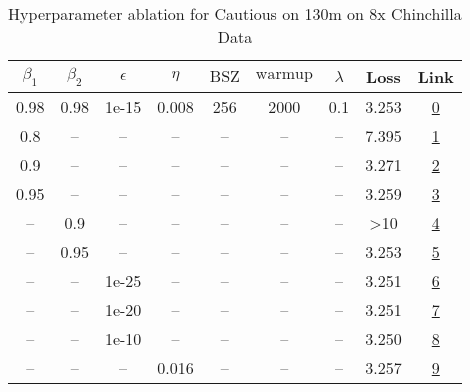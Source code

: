 \begin{table}[H]
\centering
\caption{Hyperparameter ablation for Cautious on 130m on 8x Chinchilla Data}
\label{tab:ablation_cautious_130m_8}
\begin{tabular}{ccccccccc}
\toprule
$\beta_1$ & $\beta_2$ & $\epsilon$ & $\eta$ & $\mathrm{BSZ}$ & $\mathrm{warmup}$ & $\lambda$ & Loss & Link \\
\midrule
0.98 & 0.98 & 1e-15 & 0.008 & 256 & 2000 & 0.1 & 3.253 & \href{https://wandb.ai/stanford-mercury/optimizer-scaling/runs/sweep-130m-21B-cautious3e1de9lr0.008-wd0.1-minlr0-warmup2000-b10-8f1bb6}{0} \\
\midrule
0.8 & -- & -- & -- & -- & -- & -- & 7.395 & \href{https://wandb.ai/stanford-mercury/optimizer-scaling/runs/sweep-130m-21B-cautious903025lr0.008-wd0.1-minlr0-warmup2000-b10-c9b0ed}{1} \\
0.9 & -- & -- & -- & -- & -- & -- & 3.271 & \href{https://wandb.ai/stanford-mercury/optimizer-scaling/runs/sweep-130m-21B-cautiousdb200alr0.008-wd0.1-minlr0-warmup2000-b10-d34aeb}{2} \\
0.95 & -- & -- & -- & -- & -- & -- & 3.259 & \href{https://wandb.ai/stanford-mercury/optimizer-scaling/runs/sweep-130m-21B-cautious1b41e3lr0.008-wd0.1-minlr0-warmup2000-b10-e60376}{3} \\
-- & 0.9 & -- & -- & -- & -- & -- & >10 & \href{https://wandb.ai/stanford-mercury/optimizer-scaling/runs/sweep-130m-21B-cautious918292lr0.008-wd0.1-minlr0-warmup2000-b10-43c09c}{4} \\
-- & 0.95 & -- & -- & -- & -- & -- & 3.253 & \href{https://wandb.ai/stanford-mercury/optimizer-scaling/runs/sweep-130m-21B-cautious8370eflr0.008-wd0.1-minlr0-warmup2000-b10-beca91}{5} \\
-- & -- & 1e-25 & -- & -- & -- & -- & 3.251 & \href{https://wandb.ai/stanford-mercury/optimizer-scaling/runs/sweep-130m-21B-cautious40f0d8lr0.008-wd0.1-minlr0-warmup2000-b10-5be279}{6} \\
-- & -- & 1e-20 & -- & -- & -- & -- & 3.251 & \href{https://wandb.ai/stanford-mercury/optimizer-scaling/runs/sweep-130m-21B-cautious000697lr0.008-wd0.1-minlr0-warmup2000-b10-767fda}{7} \\
-- & -- & 1e-10 & -- & -- & -- & -- & 3.250 & \href{https://wandb.ai/stanford-mercury/optimizer-scaling/runs/sweep-130m-21B-cautious3d84f2lr0.008-wd0.1-minlr0-warmup2000-b10-222f29}{8} \\
-- & -- & -- & 0.016 & -- & -- & -- & 3.257 & \href{https://wandb.ai/stanford-mercury/optimizer-scaling/runs/sweep-130m-21B-cautiousa3617alr0.016-wd0.1-minlr0-warmup2000-b10-3a0195}{9} \\

\end{tabular}
\end{table}
